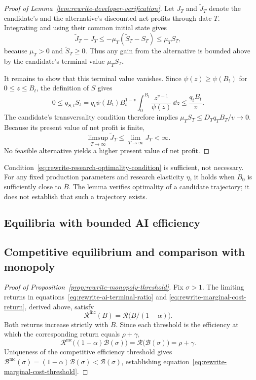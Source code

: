 \begin{proof}[Proof of Lemma~\ref{lem:rewrite-developer-verification}]
Let $J_T$ and $\widetilde J_T$ denote the candidate's and the alternative's
discounted net profits through date $T$. Integrating and using their
common initial state gives
\[
 \widetilde J_T-J_T
 \leq-\mu_T(\widetilde S_T-S_T)\leq\mu_TS_T,
\]
because $\mu_T>0$ and $\widetilde S_T\geq0$.
Thus any gain from the alternative is bounded above by the candidate's
terminal value $\mu_TS_T$.

It remains to show that this terminal value vanishes.
Since $\psi(z)\geq\psi(B_t)$ for $0\leq z\leq B_t$, the definition of $S$
gives
\[
 0\leq q_{S,t}S_t
 =q_t\psi(B_t)B_t^{1-v}
 \int_0^{B_t}\frac{z^{v-1}}{\psi(z)}\,\dd z
 \leq\frac{q_tB_t}{v}.
\]
The candidate's transversality condition therefore implies
$\mu_TS_T\leq D_Tq_TB_T/v\to0$.
Because its present value of net profit is finite,
\[
 \limsup_{T\to\infty}\widetilde J_T
 \leq\lim_{T\to\infty}J_T<\infty.
\]
No feasible alternative yields a higher present value of net profit.
\end{proof}

Condition~\eqref{eq:rewrite-research-optimality-condition} is sufficient,
not necessary. For any fixed production parameters and research elasticity $\eta$,
it holds when $B_0$ is sufficiently close to $\overline B$.
The lemma verifies optimality of a candidate trajectory; it does not
establish that such a trajectory exists.

\subsection{Equilibria with bounded AI efficiency}
\label{app:rewrite-bounded-proofs}


\subsection{Competitive equilibrium and comparison with monopoly}
\label{app:rewrite-competitive-proofs}


\begin{proof}[Proof of Proposition~\ref{prop:rewrite-monopoly-threshold}]
\label{proof:rewrite-monopoly-threshold}
Fix $\sigma>1$. The limiting returns in
equations~\eqref{eq:rewrite-ai-terminal-ratio} and
\eqref{eq:rewrite-marginal-cost-return}, derived above, satisfy
\[
 \mathcal R^{\mathrm{mc}}(B)=\mathcal R\bigl(B/(1-\alpha)\bigr).
\]
Both returns increase strictly with $B$. Since each threshold is the
efficiency at which the corresponding return equals $\rho+\gamma$,
\[
 \mathcal R^{\mathrm{mc}}\bigl((1-\alpha)\mathcal B(\sigma)\bigr)
 =\mathcal R\bigl(\mathcal B(\sigma)\bigr)=\rho+\gamma.
\]
Uniqueness of the competitive efficiency threshold gives
$\mathcal B^{\mathrm{mc}}(\sigma)=(1-\alpha)\mathcal B(\sigma)
<\mathcal B(\sigma)$, establishing
equation~\eqref{eq:rewrite-marginal-cost-threshold}.
\end{proof}

